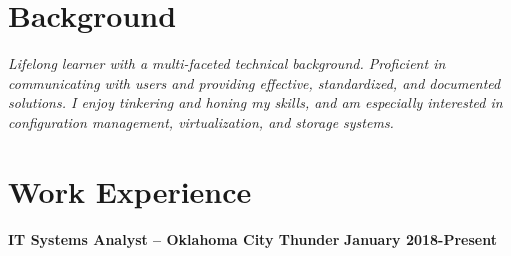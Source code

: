 \documentclass[line]{res}
\begin{document}

\address{Oklahoma City, OK $\parallel$ trjean.ou@gmail.com $\parallel$ (580) 304-6896}

\begin{resume}

\section{Background}
\emph{Lifelong learner with a multi-faceted technical background. Proficient in communicating with users and providing effective, standardized, and documented solutions. I enjoy tinkering and honing my skills, and am especially interested in configuration management, virtualization, and storage systems.}

\section{Work Experience}
\textbf{IT Systems Analyst -- Oklahoma City Thunder}
\newline
\textbf{January 2018-Present}



\end{resume}
\end{document}
